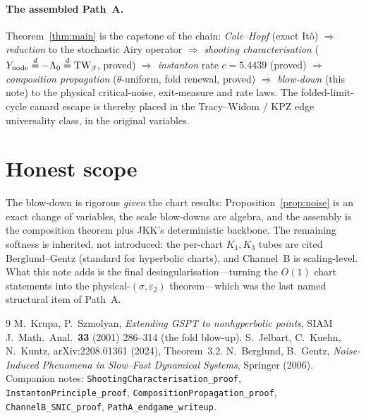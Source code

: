 \documentclass[11pt]{article}
\theoremstyle{remark}
\newcommand{\TW}{\mathrm{TW}}
\newcommand{\eqd}{\stackrel{d}{=}}
\newcommand{\ep}{\varepsilon}
\begin{document}
\paragraph{The assembled Path~A.} Theorem~\ref{thm:main} is the capstone of the chain:
\emph{Cole--Hopf} (exact It\^o) $\Rightarrow$ \emph{reduction} to the stochastic Airy
operator $\Rightarrow$ \emph{shooting characterisation} ($Y_{\rm node}\eqd-\Lambda_0\eqd
\TW_\beta$, proved) $\Rightarrow$ \emph{instanton} rate $c=5.4439$ (proved) $\Rightarrow$
\emph{composition propagation} ($\theta$-uniform, fold renewal, proved) $\Rightarrow$
\emph{blow-down} (this note) to the physical critical-noise, exit-measure and rate laws.
The folded-limit-cycle canard escape is thereby placed in the Tracy--Widom / KPZ edge
universality class, in the original variables.

\section{Honest scope}

The blow-down is rigorous \emph{given} the chart results: Proposition~\ref{prop:noise} is
an exact change of variables, the scale blow-downs are algebra, and the assembly is the
composition theorem plus JKK's deterministic backbone. The remaining softness is inherited,
not introduced: the per-chart $K_1,K_3$ tubes are cited Berglund--Gentz (standard for
hyperbolic charts), and Channel~B is scaling-level. What this note adds is the final
desingularisation---turning the $O(1)$ chart statements into the physical-$(\sigma,\ep_2)$
theorem---which was the last named structural item of Path~A.

\begin{thebibliography}{9}
 M.~Krupa, P.~Szmolyan, \emph{Extending GSPT to nonhyperbolic points},
SIAM J.\ Math.\ Anal.\ \textbf{33} (2001) 286--314 (the fold blow-up).
 S.~Jelbart, C.~Kuehn, N.~Kuntz, arXiv:2208.01361 (2024), Theorem~3.2.
 N.~Berglund, B.~Gentz, \emph{Noise-Induced Phenomena in Slow--Fast Dynamical
Systems}, Springer (2006).
 Companion notes: \texttt{ShootingCharacterisation\_proof},
\texttt{InstantonPrinciple\_proof}, \texttt{CompositionPropagation\_proof},
\texttt{ChannelB\_SNIC\_proof}, \texttt{PathA\_endgame\_writeup}.
\end{thebibliography}
\end{document}
